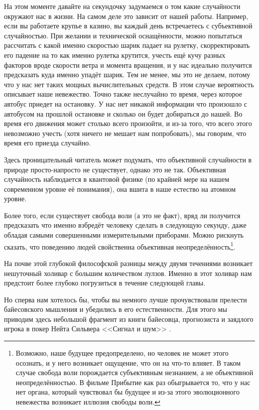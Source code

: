 На этом моменте давайте на секундочку задумаемся о том какие случайности окружают нас в жизни. На самом деле это зависит от нашей работы. Например, если вы работаете крупье в казино, вы каждый день встречаетесь с субъективной случайностью. При желании и технической оснащённости, можно попытаться рассчитать с какой именно скоростью шарик падает на рулетку, скорректировать его падение на то как именно рулетка крутится, учесть ещё кучу разных факторов вроде скорости ветра и момента вращения, и у нас идеально получится предсказать куда именно упадёт шарик. Тем не менее, мы это не делаем, потому что у нас нет таких мощных вычислительных средств. В этом случае вероятность описывает наше невежество. Точно также неслучайно то время, через которое автобус приедет на остановку. У нас нет никакой информации что произошло с автобусом  на прошлой остановке и сколько он будет добираться до нашей. Во время его движения может столько всего произойти, и из-за того, что всего этого невозможно учесть (хотя ничего не мешает нам попробовать), мы говорим, что время его приезда случайно.

Здесь проницательный читатель может подумать, что объективной случайности в природе просто-напросто не существует, однако это не так. Объективная случайность наблюдается в квантовой физике (по крайней мере на нашем современном уровне её понимания), она вшита в наше естество на атомном уровне. 

Более того, если существует свобода воли (а это не факт), вряд ли получится предсказать что именно взбредёт человеку сделать в следующую секунду, даже обладая самыми совершенными измерительными приборами. Можно рискнуть сказать, что поведению людей свойственна объективная неопределённость\footnote{Возможно, наше будущее предопределено, но человек не может этого осознать, и у него возникает ощущение, что он на что-то влияет. В таком случае свобода воли порождается субъективным незнанием, а не объективной неопределённостью. В фильме Прибытие как раз обыгрывается то, что у нас нет органа, который чувствовал бы будущее и из-за этого эволюционного невежества возникает иллюзия свободы воли.}.

На почве этой глубокой философской разницы между двумя течениями возникает нешуточный холивар с большим количеством лулзов. Именно в этот холивар нам предстоит более глубоко погрузиться в течение следующей главы.

Но сперва нам хотелось бы, чтобы вы немного лучше прочувствовали прелести байесовского мышления и убедились в его естественности. Для этого мы приводим здесь небольшой фрагмент из книги байесовца, прогнозиста и заядлого игрока в покер Нейта Сильвера <<Сигнал и шум>> \cite{silver2012signal}.

